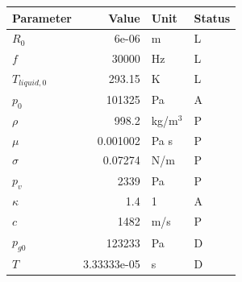 \begin{tabular}{lrll}
\toprule
Parameter & Value & Unit & Status\\\midrule
$R_0$ & 6e-06 & m & L\\
$f$ & 30000 & Hz & L\\
$T_{liquid,0}$ & 293.15 & K & L\\
$p_0$ & 101325 & Pa & A\\
$\rho$ & 998.2 & kg/m$^3$ & P\\
$\mu$ & 0.001002 & Pa s & P\\
$\sigma$ & 0.07274 & N/m & P\\
$p_v$ & 2339 & Pa & P\\
$\kappa$ & 1.4 & 1 & A\\
$c$ & 1482 & m/s & P\\
$p_{g0}$ & 123233 & Pa & D\\
$T$ & 3.33333e-05 & s & D\\
\bottomrule
\end{tabular}
